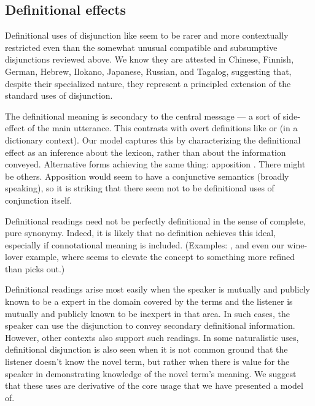 \documentclass{article}
\begin{document}

\subsection{Definitional effects}\label{sec:data:definitional}


Definitional uses of disjunction like 
seem to be rarer and more contextually restricted even than the
somewhat unusual compatible and subsumptive disjunctions reviewed
above. We know they are attested in Chinese, Finnish, German, Hebrew,
Ilokano, Japanese, Russian, and Tagalog, suggesting that, despite
their specialized nature, they represent a principled extension of the
standard uses of disjunction.

The definitional meaning is secondary to the central message --- a
sort of side-effect of the main utterance. This contrasts with overt
definitions like  or
 (in a dictionary context). Our model
captures this by characterizing the definitional effect as an
inference about the lexicon, rather than about the information
conveyed. Alternative forms achieving the same thing: apposition
. There might be others. Apposition
would seem to have a conjunctive semantics (broadly speaking), so it
is striking that there seem not to be definitional uses of conjunction
itself.

Definitional readings need not be perfectly definitional in the sense
of complete, pure synonymy. Indeed, it is likely that no definition
achieves this ideal, especially if connotational meaning is
included. (Examples: , and even our
wine-lover example, where  seems to elevate the
concept to something more refined than  picks out.)

Definitional readings arise most easily when the speaker is mutually
and publicly known to be a expert in the domain covered by the terms
and the listener is mutually and publicly known to be inexpert in that
area. In such cases, the speaker can use the disjunction to convey
secondary definitional information. However, other contexts also
support such readings. In some naturalistic uses, definitional
disjunction is also seen when it is not common ground that the
listener doesn't know the novel term, but rather when there is value
for the speaker in demonstrating knowledge of the novel term's
meaning.  We suggest that these uses are derivative of the core usage
that we have presented a model of.
\end{document}
